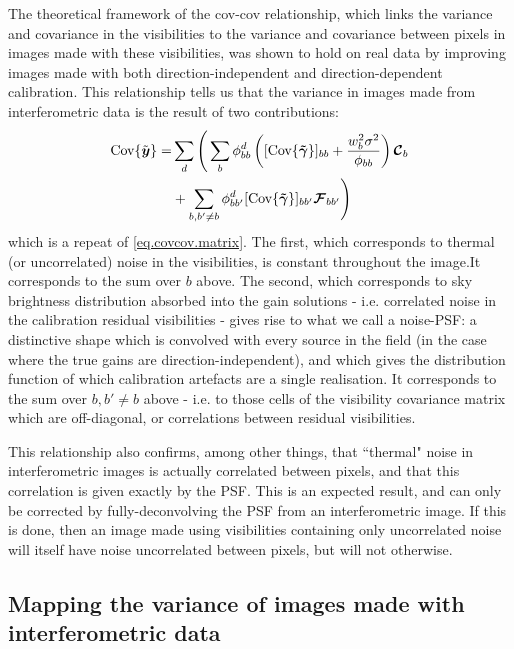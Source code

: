 \pg
The theoretical framework of the cov-cov relationship, which links the variance and covariance in the visibilities to the variance and covariance between pixels in images made with these visibilities, was shown to hold on real data by improving images made with both direction-independent and direction-dependent calibration. This relationship tells us that the variance in images made from interferometric data is the result of two contributions:
\begin{align}
\textrm{Cov}\{\tilde{\bm{{{y}}}}\} =& \sum_d \Bigg(\sum_b \phi_{bb}^d \left( [\textrm{Cov}\{\bm{\tilde{\gamma}}\}]_{bb} + \frac{w_b^2 \sigma^2}{\phi_{bb}} \right) \bm{\mathcal{C}}_b\nonumber\\
              &+ \sum_{b,b'\ne b}  \phi_{bb'}^d [\textrm{Cov}\{\bm{\tilde{\gamma}}\}]_{bb'} \bm{\mathcal{F}}_{bb'} \Bigg)
\end{align}
which is a repeat of \cref{eq.covcov.matrix}. The first, which corresponds to thermal (or uncorrelated) noise in the visibilities, is constant throughout the image.It corresponds to the sum over $b$ above. The second, which corresponds to sky brightness distribution absorbed into the gain solutions - i.e. correlated noise in the calibration residual visibilities - gives rise to what we call a noise-PSF: a distinctive shape which is convolved with every source in the field (in the case where the true gains are direction-independent), and which gives the distribution function of which calibration artefacts are a single realisation. It corresponds to the sum over $b,b'\ne b$ above - i.e. to those cells of the visibility covariance matrix which are off-diagonal, or correlations between residual visibilities.

\pg
This relationship also confirms, among other things, that ``thermal" noise in interferometric images is actually correlated between pixels, and that this correlation is given exactly by the PSF. This is an expected result, and can only be corrected by fully-deconvolving the PSF from an interferometric image. If this is done, then an image made using visibilities containing only uncorrelated noise will itself have noise uncorrelated between pixels, but will not otherwise.


\subsection{Mapping the variance of images made with interferometric data}


